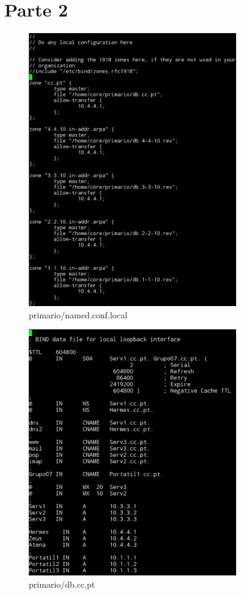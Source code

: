 \documentclass[a4paper]{report}
\begin{document}
\chapter{Parte 2}
\begin{figure}[H]
    \centering 
    \includegraphics[width=0.8\textwidth]{images/primary_ncl.png}  
    \caption{primario/named.conf.local}
    \label{fig:primary_ncl}
\end{figure}

\begin{figure}[H]
    \centering 
    \includegraphics[width=0.8\textwidth]{images/dbccpt.png}  
    \caption{primario/db.cc.pt}
    \label{fig:dbccpt}
\end{figure}
\end{document}
